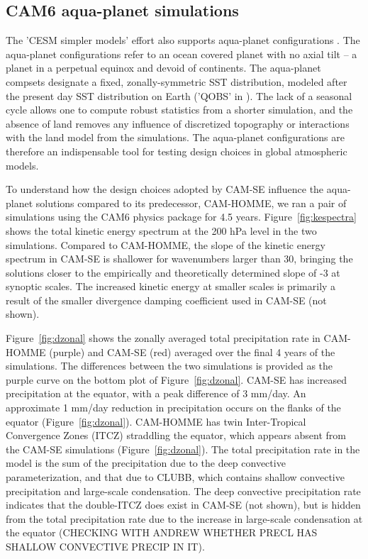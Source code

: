 \subsection{CAM6 aqua-planet simulations}\label{sec:APE}
The 'CESM simpler models' effort also supports aqua-planet configurations \citep{MWO2016JAMES}. The aqua-planet configurations \citep{NH2000ASL} refer to an ocean covered planet with no axial tilt -- a planet in a perpetual equinox and devoid of continents. The aqua-planet compsets designate a fixed, zonally-symmetric SST distribution, modeled after the present day SST distribution on Earth ('QOBS' in \cite{NH2000ASL}). The lack of a seasonal cycle allows one to compute robust statistics from a shorter simulation, and the absence of land removes any influence of discretized topography or interactions with the land model from the simulations. The aqua-planet configurations are therefore an indispensable tool for testing design choices in global atmospheric models.

To understand how the design choices adopted by CAM-SE influence the aqua-planet solutions compared to its predecessor, CAM-HOMME, we ran a pair of simulations using the CAM6 physics package {\color{red}{[CAM6 reference]}} for 4.5 years. Figure~\ref{fig:kespectra} shows the total kinetic energy spectrum at the 200 hPa level in the two simulations. Compared to CAM-HOMME, the slope of the kinetic energy spectrum in CAM-SE is shallower for wavenumbers larger than 30, bringing the solutions closer to the empirically \citep{NG1985JAS} and theoretically \citep{C1971JAS} determined slope of -3 at synoptic scales. The increased kinetic energy at smaller scales is primarily a result of the smaller divergence damping coefficient used in CAM-SE (not shown).

 Figure~\ref{fig:dzonal} shows the zonally averaged total precipitation rate in CAM-HOMME (purple) and CAM-SE (red) averaged over the final 4 years of the simulations. The differences between the two simulations is provided as the purple curve on the bottom plot of Figure~\ref{fig:dzonal}. CAM-SE has increased precipitation at the equator, with a peak difference of 3 mm/day. An approximate 1 mm/day reduction in precipitation occurs on the flanks of the equator (Figure~\ref{fig:dzonal}). CAM-HOMME has twin Inter-Tropical Convergence Zones (ITCZ) straddling the equator, which appears absent from the CAM-SE simulations (Figure~\ref{fig:dzonal}). The total precipitation rate in the model is the sum of the precipitation due to the deep convective parameterization, and that due to CLUBB, which contains shallow convective precipitation and large-scale condensation. The deep convective precipitation rate indicates that the double-ITCZ does exist in CAM-SE (not shown), but is hidden from the total precipitation rate due to the increase in large-scale condensation at the equator (CHECKING WITH ANDREW WHETHER PRECL HAS SHALLOW CONVECTIVE PRECIP IN IT).

